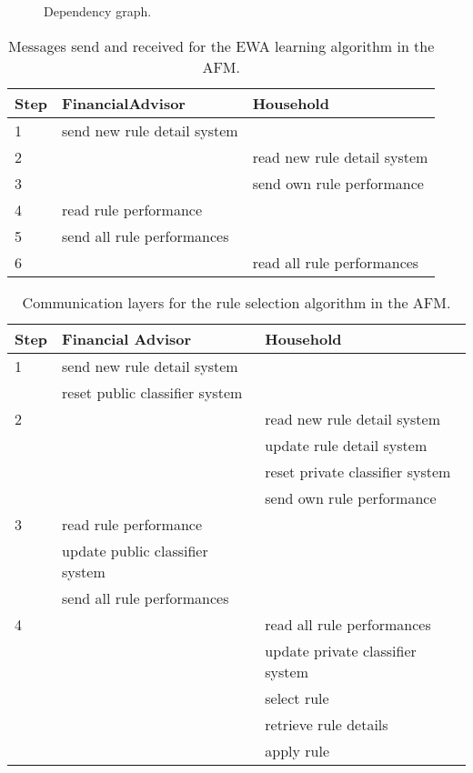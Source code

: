 \documentclass[a4paper,11pt]{article}
\begin{document}
\pagestyle{empty}
\begin{figure}[t!]
\centering\leavevmode
{}
\caption{Dependency graph.}
\label{Figure: graph}
\end{figure}
\clearpage


\begin{table}
  \centering
  \begin{tabular}{|l|l|l|}
  \hline
  Step & FinancialAdvisor & Household \\
  \hline\hline
    1 & send new rule detail system &   \\  \hline
    2 &                             & read new rule detail system \\  \hline
    3 &                             & send own rule performance \\  \hline
    4 & read rule performance       &  \\  \hline
    5 & send all rule performances  &  \\  \hline
    6 &                             & read all rule performances \\
  \hline
  \end{tabular}
  \caption{Messages send and received for the EWA learning algorithm in the AFM.}
  \label{Table: messages}
\end{table}

\begin{table}
  \centering
  \begin{tabular}{|l|l|l|}
  \hline
  Step & Financial Advisor & Household \\
  \hline\hline
    1 & send new rule detail system &   \\
      & reset public classifier system &   \\
    \hline
    2 &                             & read new rule detail system \\
      &                             & update rule detail system \\
      &                             & reset private classifier system \\
      &                             & send own rule performance \\
    \hline
    3 & read rule performance       &  \\
      & update public classifier system &   \\
      & send all rule performances  &  \\  \hline
    4 &                             & read all rule performances \\
      &                             & update private classifier system \\
      &                             & select rule\\
      &                             & retrieve rule details\\
      &                             & apply rule\\      
  \hline
  \end{tabular}
  \caption{Communication layers for the rule selection algorithm in the AFM.}
  \label{Table: messages}
\end{table}
\end{document}
